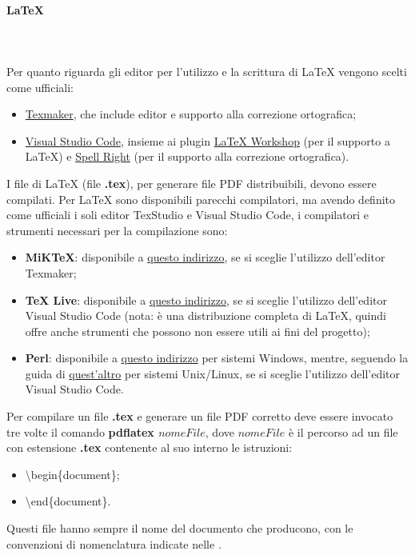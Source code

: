 \paragraph{\LaTeX}\mbox{} \\ \\
Per quanto riguarda gli editor per l'utilizzo e la scrittura di \LaTeX{} vengono scelti come ufficiali:
\begin{itemize}
	\item \href{https://www.xm1math.net/texmaker/}{Texmaker}, che include editor e supporto alla correzione ortografica;
	\item \href{https://code.visualstudio.com/}{Visual Studio Code}, insieme ai plugin \href{https://github.com/James-Yu/LaTeX-Workshop}{LaTeX Workshop} (per il supporto a \LaTeX) e \href{https://github.com/bartosz-antosik/vscode-spellright}{Spell Right} (per il supporto alla correzione ortografica).
\end{itemize}
I file di \LaTeX{} (file \textbf{.tex}), per generare file PDF distribuibili, devono essere compilati.
Per \LaTeX{} sono disponibili parecchi compilatori, ma avendo definito come ufficiali i soli editor TexStudio e Visual Studio Code,
i compilatori e strumenti necessari per la compilazione sono:
\begin{itemize}
    \item \textbf{MiKTeX}: disponibile a \href{https://miktex.org/}{questo indirizzo}, se si sceglie l'utilizzo dell'editor Texmaker;
    \item \textbf{TeX Live}: disponibile a \href{https://www.tug.org/texlive/}{questo indirizzo}, se si sceglie l'utilizzo dell'editor Visual Studio Code (nota: è una distribuzione completa di \LaTeX, quindi offre anche strumenti che possono non essere utili ai fini del progetto);
    \item \textbf{Perl}: disponibile a \href{http://strawberryperl.com/}{questo indirizzo} per sistemi Windows, mentre, seguendo la guida di \href{https://learn.perl.org/installing/unix_linux.html}{quest'altro} per sistemi Unix/Linux, se si sceglie l'utilizzo dell'editor Visual Studio Code.
\end{itemize}
Per compilare un file \textbf{.tex} e generare un file PDF corretto deve essere invocato tre volte il comando \textbf{pdflatex $nomeFile$}, dove $nomeFile$ è il percorso ad un file con estensione \textbf{.tex} contenente al suo interno le istruzioni:
\begin{itemize}
    \item \textbackslash begin\{document\};
    \item \textbackslash end\{document\}.
\end{itemize}
Questi file hanno sempre il nome del documento che producono, con le convenzioni di nomenclatura indicate nelle \NdP{}.

